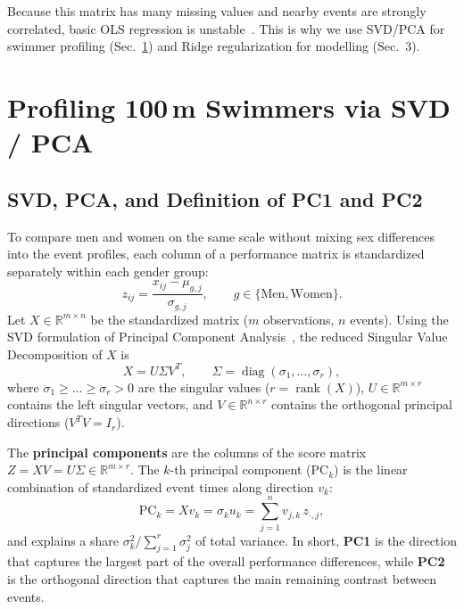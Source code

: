 \documentclass[11pt, a4paper]{article}
\begin{document}
\noindent Because this matrix has many missing values and nearby events are strongly correlated, basic OLS regression is unstable~\cite{wasserman2004, hastie2009}. This is why we use SVD/PCA for swimmer profiling (Sec.~\ref{sec:profiling}) and Ridge regularization for modelling (Sec.~3).

\section{Profiling \texorpdfstring{100\,m}{100m} Swimmers via SVD / PCA}
\label{sec:profiling}

\subsection{SVD, PCA, and Definition of PC1 and PC2}

To compare men and women on the same scale without mixing sex differences into the event profiles, each column of a performance matrix is standardized separately within each gender group:
\[
    z_{ij} = \frac{x_{ij} - \mu_{g,j}}{\sigma_{g,j}}, \qquad g \in \{\text{Men}, \text{Women}\}.
\]
Let $X \in \mathbb{R}^{m \times n}$ be the standardized matrix ($m$ observations, $n$ events). Using the SVD formulation of Principal Component Analysis~\cite{hastie2009}, the reduced Singular Value Decomposition of $X$ is
\begin{equation}
    X = U \Sigma V^T, \qquad \Sigma = \operatorname{diag}(\sigma_1, \dots, \sigma_r),
\end{equation}
where $\sigma_1 \ge \dots \ge \sigma_r > 0$ are the singular values ($r = \operatorname{rank}(X)$), $U \in \mathbb{R}^{m \times r}$ contains the left singular vectors, and $V \in \mathbb{R}^{n \times r}$ contains the orthogonal principal directions ($V^T V = I_r$).

The \textbf{principal components} are the columns of the score matrix $Z = XV = U\Sigma \in \mathbb{R}^{m \times r}$. The $k$-th principal component ($\text{PC}_k$) is the linear combination of standardized event times along direction $v_k$:
\begin{equation}
    \text{PC}_k = X v_k = \sigma_k u_k = \sum_{j=1}^{n} v_{j,k}\, z_{\cdot, j},
\end{equation}
and explains a share $\sigma_k^2 / \sum_{j=1}^r \sigma_j^2$ of total variance. In short, \textbf{PC1} is the direction that captures the largest part of the overall performance differences, while \textbf{PC2} is the orthogonal direction that captures the main remaining contrast between events.
\end{document}
